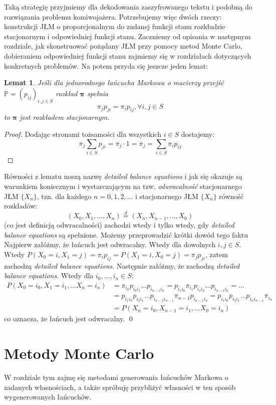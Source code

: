 \documentclass[a4paper]{article}
\theoremstyle{defn}
\theoremstyle{theorem}
\theoremstyle{lemma}
\newtheorem{lemma}[defn]{Lemat}
\theoremstyle{cor}
\theoremstyle{fact}
\begin{document}
Taką strategię przyjmiemy dla dekodowania zaszyfrowanego tekstu i podobną do rozwiązania problemu komiwojażera.
Potrzebujemy więc dwóch rzeczy: konstrukcji JŁM o proporcjonalnym do zadanej funkcji stanu rozkładzie stacjonarnym i odpowiedniej funkcji stanu. Zaczniemy od opisania w następnym rozdziale, jak skonstruować pożądany JŁM przy pomocy metod Monte Carlo, dobieraniem odpowiedniej funkcji stanu zajmiemy się w rozdziałach dotyczących konkretnych problemów. Na potem przyda się jeszcze jeden lemat:
\begin{lemma}\label{lemma2.7.1}
Jeśli dla jednorodnego łańcucha Markowa o macierzy przejść $\mathbb{P} = (p_{ij})_{i, j \in S}$ rozkład $\boldsymbol{\pi}$ spełnia $$\pi_j p_{ji} = \pi_i p_{ij},  \forall i,j \in S$$ to $\boldsymbol{\pi}$ jest rozkładem stacjonarnym.
\end{lemma}
\begin{proof} Dodając stronami  tożsamości dla wszystkich $i \in S$ dostajemy: 
$$\pi_j \sum\limits_{i \in S} p_{ji} = \pi_j \cdot 1 = \pi_j = \sum\limits_{i \in S} \pi_i p_{ij}$$ 
\end{proof}
Równości z lematu noszą nazwę \textit{detailed balance equations} i jak się okazuje są warunkiem koniecznym i wystarczającym na tzw. \textit{odwracalność} stacjonarnego JŁM $\{X_n\}$, tzn. dla każdego $n = 0,1,2,...$ i stacjonarnego JŁM $\{X_n\}$ równość rozkładów:
$$(X_0, X_1, ..., X_n) \overset{d}{=} (X_n, X_{n-1}, ..., X_0)$$
(co jest definicją odwracalności) zachodzi wtedy i tylko wtedy, gdy \textit{detailed balance equations} są spełnione.
Możemy przeprowadzić krótki dowód tego faktu
Najpierw załóżmy, że łańcuch jest odwracalny. Wtedy dla dowolnych $i,j \in S$. Wtedy $P(X_0 = i, X_1 = j) = \pi_i p_{ij} = P(X_1 = i, X_0 = j) = \pi_j p_{ji}$, zatem zachodzą \textit{detailed balance equations}. Następnie załóżmy, że zachodzą \textit{detailed balance equations}. Wtedy dla $i_0, ..., i_n \in S$:
\begin{align*}
P(X_0 = i_0, X_1 = i_1, ... X_n = i_n) &= \pi_{i_0} p_{i_0 i_1} ... p_{i_{n-1} i_n} =
p_{i_1 i_0} \pi_{i_1}  p_{i_1 i_2} ... p_{i_{n-1} i_n} = ... \\ &=p_{i_1 i_0} p_{i_2 i_1} ... p_{i_{n-2} i_{n-1}} \pi_{n-1} p_{i_{n-1} i_n} = p_{i_1 i_0} p_{i_2 i_1} ... p_{i_{n} i_{n-1}} \pi_{i_n} \\
&=P(X_n = i_0, X_{n-1} = i_1, ... X_0 = i_n)
\end{align*}
co oznacza, że łańcuch jest odwracalny. \qed
\newpage
\section{Metody Monte Carlo}
W rozdziale tym zajmę się metodami generowania łańcuchów Markowa o zadanych własnościach, a także spróbuję przybliżyć własności w ten sposób wygenerowanych łańcuchów.
\\
\end{document}
